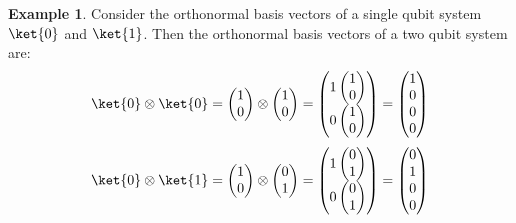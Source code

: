 \documentclass[12pt, oneside]{book}
\theoremstyle{definition}
\theoremstyle{definition}
\newtheorem{example}{Example}[section]
\theoremstyle{remark}
\begin{document}
\begin{example}
    Consider the orthonormal basis vectors of a single qubit system $\ket{0}$ and $\ket{1}$. Then the orthonormal basis vectors of a two qubit system are:
    \[ \ket{0} \otimes \ket{0} = \begin{pmatrix} 1 \\ 0 \end{pmatrix} \otimes \begin{pmatrix} 1 \\ 0 \end{pmatrix} = \begin{pmatrix} 1 \begin{pmatrix} 1 \\ 0 \end{pmatrix} \\ 0 \begin{pmatrix} 1 \\ 0 \end{pmatrix} \end{pmatrix} = \begin{pmatrix} 1 \\ 0 \\ 0 \\ 0 \end{pmatrix} \]
    \[ \ket{0} \otimes \ket{1} = \begin{pmatrix} 1 \\ 0 \end{pmatrix} \otimes \begin{pmatrix} 0 \\ 1 \end{pmatrix} = \begin{pmatrix} 1 \begin{pmatrix} 0 \\ 1 \end{pmatrix} \\ 0 \begin{pmatrix} 0 \\ 1 \end{pmatrix} \end{pmatrix} = \begin{pmatrix} 0 \\ 1 \\ 0 \\ 0 \end{pmatrix} \]

\end{example}
\end{document}
